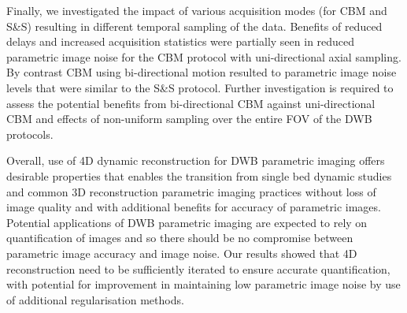 Finally, we investigated the impact of various acquisition modes (for CBM and S\&S) resulting in different temporal sampling of the data. Benefits of reduced delays and increased acquisition statistics were partially seen in reduced parametric image noise for the CBM protocol with uni-directional axial sampling. By contrast CBM using bi-directional motion resulted to parametric image noise levels that were similar to the S\&S protocol. Further investigation is required to assess the potential benefits from bi-directional CBM against uni-directional CBM and effects of non-uniform sampling over the entire FOV of the DWB protocols.

Overall, use of 4D dynamic reconstruction for DWB parametric imaging offers desirable properties that enables the transition from single bed dynamic studies and common 3D reconstruction parametric imaging practices without loss of image quality and with additional benefits for accuracy of parametric images. 
Potential applications of DWB parametric imaging are expected to rely on quantification of images and so there should be no compromise between parametric image accuracy and image noise. Our results showed that 4D reconstruction need to be sufficiently iterated to ensure accurate quantification, with potential for improvement in maintaining low parametric image noise by use of additional regularisation methods.

